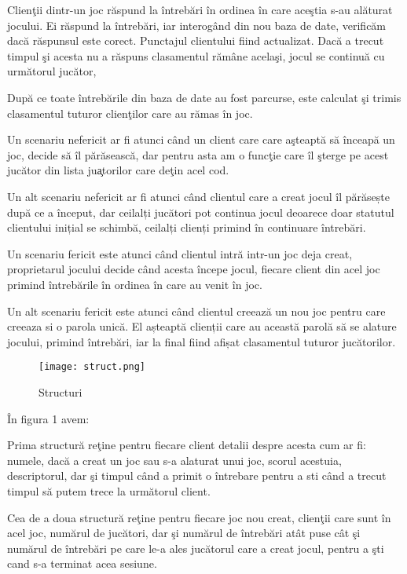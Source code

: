 \documentclass[11pt,leqno, runningheads]{llncs}
\begin{document}
Clien\c tii dintr-un joc r\u aspund la \^{i}ntreb\u ari \^{i}n ordinea \^{i}n care ace\c stia s-au al\u aturat jocului. Ei r\u aspund la \^{i}ntreb\u ari, iar interog\^{a}nd din nou baza de date, verific\u am dac\u a r\u aspunsul este corect. Punctajul clientului fiind actualizat. Dac\u a a trecut timpul \c si acesta nu a r\u aspuns clasamentul r\u am\^{a}ne acela\c si, jocul se continu\u a cu urm\u atorul juc\u ator, 


Dup\u a ce toate \^{i}ntreb\u arile din baza de date au fost parcurse, este calculat \c si trimis clasamentul tuturor clien\c tilor care au r\u amas \^{i}n joc.

Un scenariu nefericit ar fi atunci când un client care care a\c steapt\u a s\u a \^{i}nceap\u a un joc, decide s\u a \^{i}l p\u ar\u aseasc\u a, dar pentru asta am o func\c tie care \^{i}l \c sterge pe acest juc\u ator din lista ju\c atorilor care de\c tin acel cod. 

Un alt scenariu nefericit ar fi atunci când clientul care a creat jocul îl părăsește după ce a început, dar ceilalți jucători pot continua jocul deoarece doar statutul clientului inițial se schimbă, ceilalți clienți primind în continuare întrebări.

Un scenariu fericit este atunci când clientul intră intr-un joc deja creat, proprietarul jocului decide când acesta începe jocul, fiecare client din acel joc primind întrebările în ordinea în care au venit în joc. 

Un alt scenariu fericit este atunci când clientul creează un nou joc pentru care creeaza si o parola unică. El așteaptă clienții care au această parolă să se alature jocului, primind întrebări, iar la final fiind afișat clasamentul tuturor juc\u atorilor.

\vspace{2 cm}
\begin{figure}[!h]
  \texttt{[image: struct.png]}
  \centering
  \caption{Structuri}
\end{figure} 

\^{I}n figura 1 avem:

Prima structur\u a re\c tine pentru fiecare client detalii despre acesta cum ar fi: numele, dac\u a a creat un joc sau s-a alaturat unui joc, scorul acestuia, descriptorul, dar \c si timpul c\^{a}nd a primit o \^{i}ntrebare pentru a sti c\^{a}nd a trecut timpul s\u a putem trece la urm\u atorul client.

Cea de a doua structur\u a re\c tine pentru fiecare joc nou creat, clien\c tii care sunt \^{i}n acel joc, num\u arul de juc\u atori, dar \c si num\u arul de \^{i}ntreb\u ari at\^{a}t puse c\^{a}t \c si num\u arul de \^{i}ntreb\u ari pe care le-a ales juc\u atorul care a creat jocul, pentru a \c sti cand s-a terminat acea sesiune.
\end{document}

